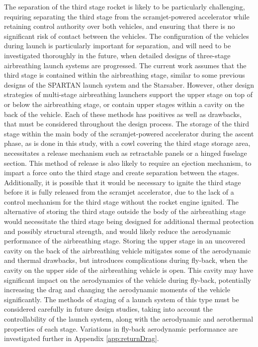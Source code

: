 The separation of the third stage rocket is likely to be particularly challenging, requiring separating the third stage from the scramjet-powered accelerator while retaining control authority over both vehicles, and ensuring that there is no significant risk of contact between the vehicles. The configuration of the vehicles during launch is particularly important for separation, and will need to be investigated thoroughly in the future, when detailed designs of three-stage airbreathing launch systems are progressed. The current work assumes that the third stage is contained within the airbreathing stage, similar to some previous designs of the SPARTAN launch system\cite{Jazra2013} and the Starsaber\cite{Germain2001}. However, other design strategies of multi-stage airbreathing launchers support the upper stage on top of\cite{Gong2014,Tsuchiya2005} or below\cite{Takahashi1997} the airbreathing stage, or contain upper stages within a cavity on the back of the vehicle\cite{Preller2017b,Mehta2001,Wilhite1991}. Each of these methods has positives as well as drawbacks, that must be considered throughout the design process.
The storage of the third stage within the main body of the scramjet-powered accelerator during the ascent phase, as is done in this study, with a cowl covering the third stage storage area, necessitates a release mechanism such as retractable panels or a hinged fuselage section. This method of release is also likely to require an ejection mechanism, to impart a force onto the third stage and create separation between the stages. Additionally, it is possible that it would be necessary to ignite the third stage before it is fully released from the scramjet accelerator, due to the lack of a control mechanism for the third stage without the rocket engine ignited. 
The alternative of storing the third stage outside the body of the airbreathing stage would necessitate the third stage being designed for additional thermal protection and possibly structural strength, and would likely reduce the aerodynamic performance of the airbreathing stage. Storing the upper stage in an uncovered cavity on the back of the airbreathing vehicle mitigates some of the aerodynamic and thermal drawbacks, but introduces complications during fly-back, when the cavity on the upper side of the airbreathing vehicle is open. This cavity may have significant impact on the aerodynamics of the vehicle during fly-back, potentially increasing the drag and changing the aerodynamic moments of the vehicle significantly. 
The methods of staging of a launch system of this type must be considered carefully in future design studies, taking into account the controllability of the launch system, along with the aerodynamic and aerothermal properties of each stage. Variations in fly-back aerodynamic performance are investigated further in Appendix \ref{app:returnDrag}. 


